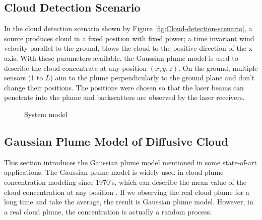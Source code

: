 \subsection{Cloud Detection Scenario\label{sub:Cloud-Detection-Scenario}}

In the cloud detection scenario shown by Figure \ref{fig:Cloud-detection-scenario},
a source produces cloud in a fixed position with fixed power; a time
invariant wind velocity parallel to the ground, blows the cloud to
the positive direction of the x-axis. With these parameters available,
the Gaussian plume model \cite{Lin1996}\cite{GPM.JA.2011} is used
to describe the cloud concentrate at any position $\left(x,y,z\right)$.
On the ground, multiple sensors (1 to $L$) aim to the plume perpendicularly
to the ground plane and don't change their positions. The positions
were chosen so that the laser beams can penetrate into the plume and
backscatters are observed by the laser receivers. 

\begin{figure}
\hfill{}\hfill{}\hfill{}

\caption{System model}
\end{figure}





\subsection{Gaussian Plume Model of Diffusive Cloud }

This section introduces the Gaussian plume model mentioned in some
state-of-art applications. The Gaussian plume model is widely used
in cloud plume concentration modeling since 1970's, which can describe
the mean value of the cloud concentration at any position \cite{Shieh1972}.
If we observing the real cloud plume for a long time and take the
average, the result is Gaussian plume model. However, in a real cloud
plume, the concentration is actually a random process. 

